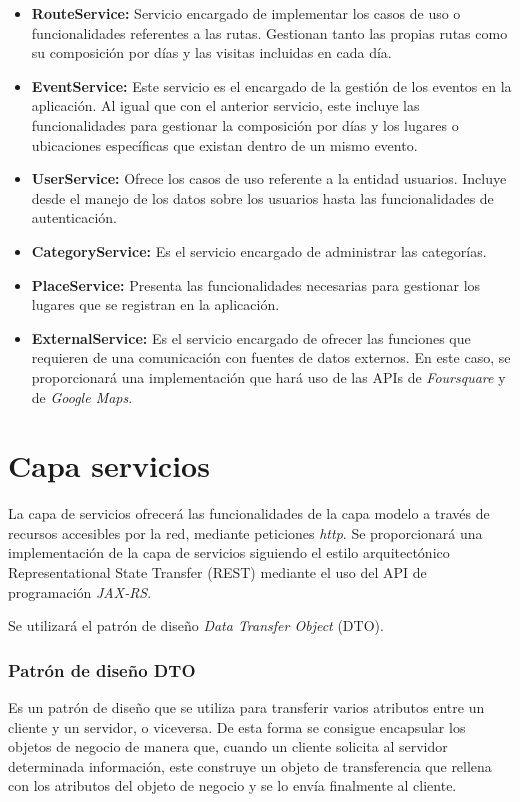 \begin{itemize}
	\item \textbf{RouteService: } Servicio encargado de implementar los casos de uso o funcionalidades referentes a las rutas. Gestionan tanto las propias rutas como su composición por días y las visitas incluidas en cada día.
	\item \textbf{EventService: } Este servicio es el encargado de la gestión de los eventos en la aplicación. Al igual que con el anterior servicio, este incluye las funcionalidades para gestionar la composición por días y los lugares o ubicaciones específicas que existan dentro de un mismo evento.
	\item \textbf{UserService: } Ofrece los casos de uso referente a la entidad usuarios. Incluye desde el manejo de los datos sobre los usuarios hasta las funcionalidades de autenticación.
	\item \textbf{CategoryService: } Es el servicio encargado de administrar las categorías.
	\item \textbf{PlaceService: } Presenta las funcionalidades necesarias para gestionar los lugares que se registran en la aplicación.
	\item \textbf{ExternalService: } Es el servicio encargado de ofrecer las funciones que requieren de una comunicación con fuentes de datos externos. En este caso, se proporcionará una implementación que hará uso de las APIs de \textit{Foursquare} y de \textit{Google Maps}.
\end{itemize}

\section{Capa servicios}
La capa de servicios ofrecerá las funcionalidades de la capa modelo a través de recursos accesibles por la red, mediante peticiones \textit{http}. Se proporcionará una implementación de la capa de servicios siguiendo el  estilo arquitectónico Representational State Transfer (REST) mediante el uso del API de programación \textit{JAX-RS}.

Se utilizará el patrón de diseño \textit{Data Transfer Object} (DTO).

\subsubsection*{Patrón de diseño DTO}
Es un patrón de diseño que se utiliza para transferir varios atributos entre un cliente y un servidor, o viceversa. De esta forma se consigue encapsular los objetos de negocio de manera que, cuando un cliente solicita al servidor determinada información, este construye un objeto de transferencia que rellena con los atributos del objeto de negocio y se lo envía finalmente al cliente.

